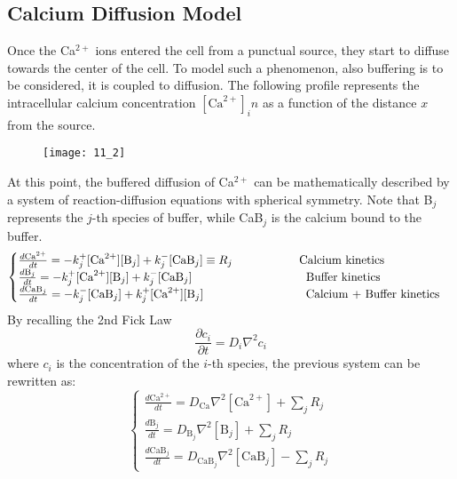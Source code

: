 \subsection{Calcium Diffusion Model}
Once the Ca\(^{2+}\) ions entered the cell from a punctual source, they start to diffuse
towards the center of the cell. To model such a phenomenon, also buffering is to be
considered, it is coupled to diffusion. The following profile represents the intracellular
calcium concentration \([\text{Ca}^{2+}]_in\) as a function of the distance \(x\) from the source.
\begin{figure}[H]
    \texttt{[image: 11\_2]}
    \centering
\end{figure}
At this point, the buffered diffusion of Ca\(^{2+}\) can be mathematically described by a
system of reaction-diffusion equations with spherical symmetry. Note that B\(_{j}\) represents
the \(j\)-th species of buffer, while CaB\(_{j}\) is the calcium bound to the buffer.
\begin{equation*}
    \begin{cases}
        \frac{d\text{Ca}^{2+}}{dt}=-k^{+}_{j}[\text{Ca}^{2+}][\text{B}_{j}]+k^{-}_{j}[\text{CaB}_{j}]\equiv{R_{j}}
        \hspace{2cm}\text{Calcium kinetics}   \\
        \frac{d\text{B}_{j}}{dt}=-k^{+}_{j}[\text{Ca}^{2+}][\text{B}_{j}]+k^{-}_{j}[\text{CaB}_{j}]
        \hspace{3.42cm}\text{Buffer kinetics} \\
        \frac{d\text{CaB}_{j}}{dt}=-k^{-}_{j}[\text{CaB}_{j}]+k^{+}_{j}[\text{Ca}^{2+}][\text{B}_{j}]
        \hspace{3.075cm}\text{Calcium + Buffer kinetics}
    \end{cases}
\end{equation*}
By recalling the 2nd Fick Law
\begin{equation*}
    \frac{\partial{c_{i}}}{\partial{t}}=D_{i}\nabla^{2}c_{i}
\end{equation*}
where \(c_{i}\) is the concentration of the \(i\)-th species, the previous system can be
rewritten as:
\begin{equation*}
    \begin{cases}
        \frac{d\text{Ca}^{2+}}{dt}=D_{\text{Ca}}\nabla^{2}[\text{Ca}^{2+}]+\sum_{j}R_{j} \\
        \frac{d\text{B}_{j}}{dt}=D_{\text{B}_{j}}\nabla^{2}[\text{B}_{j}]+\sum_{j}R_{j}  \\
        \frac{d\text{CaB}_{j}}{dt}=D_{\text{CaB}_{j}}\nabla^{2}[\text{CaB}_{j}]-\sum_{j}R_{j}
    \end{cases}
\end{equation*}
